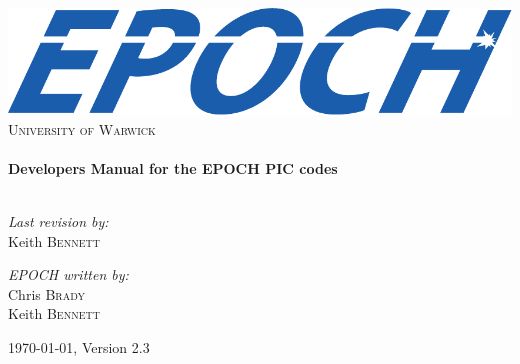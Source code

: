 \begin{titlepage}

\begin{center}

\includegraphics[width=14cm]{./images/EPOCHLogo}\\[1cm]

\textsc{\LARGE{University of Warwick}}\\[1.5cm]

\HRule\\[0.2cm]%
{\huge\bfseries{Developers Manual for the EPOCH PIC codes}}\\[0.4cm]
\HRule\\[1.5cm]

\begin{minipage}{0.4\textwidth}
\begin{flushleft}\large%
\emph{Last revision by:}\\
Keith \textsc{Bennett}
\end{flushleft}
\end{minipage}
\begin{minipage}{0.4\textwidth}
\begin{flushright}\large%
\emph{EPOCH written by:} \\
Chris \textsc{Brady}\\
Keith \textsc{Bennett}\\
\end{flushright}
\end{minipage}

\vfill%
{\large\today, {\EPOCH} Version 2.3}

\end{center}

\end{titlepage}
